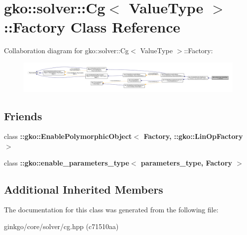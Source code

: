 \hypertarget{classgko_1_1solver_1_1Cg_1_1Factory}{}\section{gko\+:\+:solver\+:\+:Cg$<$ Value\+Type $>$\+:\+:Factory Class Reference}
\label{classgko_1_1solver_1_1Cg_1_1Factory}


Collaboration diagram for gko\+:\+:solver\+:\+:Cg$<$ Value\+Type $>$\+:\+:Factory\+:
\nopagebreak
\begin{figure}[H]
\begin{center}
\leavevmode
\includegraphics[width=350pt]{classgko_1_1solver_1_1Cg_1_1Factory__coll__graph}
\end{center}
\end{figure}
\subsection*{Friends}
\begin{DoxyCompactItemize}
\item 
\mbox{\label{classgko_1_1solver_1_1Cg_1_1Factory_a27e9bbc94a1c1c59f40833153eda8f78}} 
class {\bfseries \+::gko\+::\+Enable\+Polymorphic\+Object$<$ Factory, \+::gko\+::\+Lin\+Op\+Factory $>$}
\item 
\mbox{\label{classgko_1_1solver_1_1Cg_1_1Factory_a0d176cbd42d6214e11aee8c30ca256fc}} 
class {\bfseries \+::gko\+::enable\+\_\+parameters\+\_\+type$<$ parameters\+\_\+type, Factory $>$}
\end{DoxyCompactItemize}
\subsection*{Additional Inherited Members}


The documentation for this class was generated from the following file\+:\begin{DoxyCompactItemize}
\item 
ginkgo/core/solver/cg.\+hpp (c71510aa)\end{DoxyCompactItemize}
